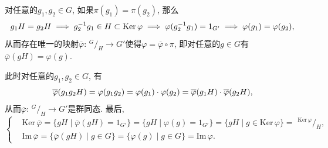 \documentclass[UTF8]{ctexart}
\begin{document}

对任意的$g_1,g_2\in G$, 如果$\pi(g_1)=\pi(g_2)$, 那么
\vspace{3pt}
\[
    g_1H=g_2H\implies g_2^{-1}g_1\in H\subset\mathrm{Ker}\,\varphi\implies
    \varphi(g_2^{-1}g_1)=1_{G'}\implies\varphi(g_1)=\varphi(g_2),\\[3pt]
\]
从而存在唯一的映射$\overline{\varphi}:\,\!^{\displaystyle G}\!/_{\displaystyle H}
\to G'$使得$\varphi=\overline{\varphi}\circ\pi$, 即对任意的$g\in G$有
$\overline{\varphi}(gH)=\varphi(g)$.

\vspace{3pt}
此时对任意的$g_1,g_2\in G$, 有
\[
    \overline{\varphi}(g_1g_2H)=\varphi(g_1g_2)=\varphi(g_1)\cdot\varphi(g_2)=
    \overline{\varphi}(g_1H)\cdot\overline{\varphi}(g_2H),\\[3pt]
\]
从而$\overline{\varphi}:\,\!^{\displaystyle G}\!/_{\displaystyle H}
\to G'$是群同态. 最后,
\vspace{5pt}
\begin{equation*}\left\{\begin{aligned}
    &\mathrm{Ker}\,\overline{\varphi}=\{gH\mid\overline{\varphi}(gH)=1_{G'}\}=
    \{gH\mid\varphi(g)=1_{G'}\}=\{gH\mid g\in\mathrm{Ker}\,\varphi\}=\,
    \,\!^{\displaystyle\mathrm{Ker}\,\varphi}\!/_{\displaystyle H},\\[3pt]
    &\mathrm{Im}\,\overline{\varphi}=\{\overline{\varphi}(gH)\mid g\in G\}=
    \{\varphi(g)\mid g\in G\}=\mathrm{Im}\,\varphi.
\end{aligned}\right.\tag*{\qedsymbol}\end{equation*}
\end{document}
